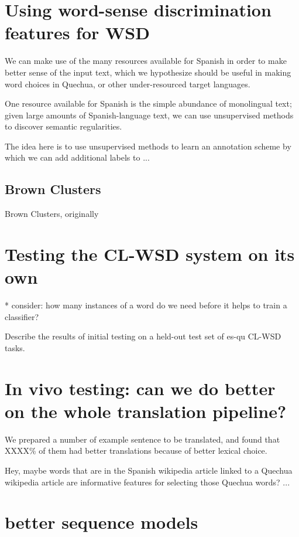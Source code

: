 \documentclass[10pt, a4paper]{article}
\begin{document}
\section{Using word-sense discrimination features for WSD}

We can make use of the many resources available for Spanish in order to make
better sense of the input text, which we hypothesize should be useful in making
word choices in Quechua, or other under-resourced target languages.


One resource available for Spanish is the simple abundance of monolingual text;
given large amounts of Spanish-language text, we can use unsupervised methods
to discover semantic regularities.


The idea here is to use unsupervised methods to learn an annotation scheme by
which we can add additional labels to ...


\subsection{Brown Clusters}
Brown Clusters, originally 




\section{Testing the CL-WSD system on its own}
* consider: how many instances of a word do we need before it helps to train a
classifier?


Describe the results of initial testing on a held-out test set of es-qu CL-WSD
tasks.


\section{In vivo testing: can we do better on the whole translation pipeline?}


We prepared a number of example sentence to be translated, and found that
XXXX\% of them had better translations because of better lexical choice.


Hey, maybe words that are in the Spanish wikipedia article linked to a Quechua
wikipedia article are informative features for selecting those Quechua words?
...


\section{better sequence models}
\end{document}
